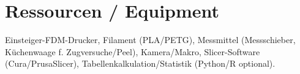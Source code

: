 \chapter{Ressourcen / Equipment}
\label{cha:Ressourcen / Equipment}

Einsteiger-FDM-Drucker, Filament (PLA/PETG), Messmittel (Messschieber, Küchenwaage f. Zugversuche/Peel), Kamera/Makro, Slicer-Software (Cura/PrusaSlicer), Tabellenkalkulation/Statistik (Python/R optional).